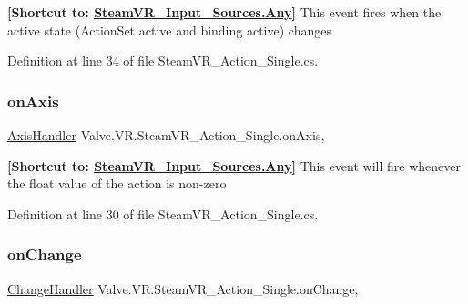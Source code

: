 {\bfseries{\mbox{[}Shortcut to\+: \mbox{\hyperlink{namespace_valve_1_1_v_r_a82e5bf501cc3aa155444ee3f0662853faed36a1ef76a59ee3f15180e0441188ad}{Steam\+V\+R\+\_\+\+Input\+\_\+\+Sources.\+Any}}\mbox{]}}} This event fires when the active state (Action\+Set active and binding active) changes 



Definition at line 34 of file Steam\+V\+R\+\_\+\+Action\+\_\+\+Single.\+cs.

\mbox{\label{class_valve_1_1_v_r_1_1_steam_v_r___action___single_a54b775fb731fcfddfb12298d3c6cd42c}} 
\subsubsection{\texorpdfstring{onAxis}{onAxis}}
{\footnotesize\ttfamily \mbox{\hyperlink{class_valve_1_1_v_r_1_1_steam_v_r___action___single_a4193937cd6b6e4b7248374bc5636f6fd}{Axis\+Handler}} Valve.\+V\+R.\+Steam\+V\+R\+\_\+\+Action\+\_\+\+Single.\+on\+Axis\hspace{0.3cm}{\ttfamily [add]}, {\ttfamily [remove]}}



{\bfseries{\mbox{[}Shortcut to\+: \mbox{\hyperlink{namespace_valve_1_1_v_r_a82e5bf501cc3aa155444ee3f0662853faed36a1ef76a59ee3f15180e0441188ad}{Steam\+V\+R\+\_\+\+Input\+\_\+\+Sources.\+Any}}\mbox{]}}} This event will fire whenever the float value of the action is non-\/zero 



Definition at line 30 of file Steam\+V\+R\+\_\+\+Action\+\_\+\+Single.\+cs.

\mbox{\label{class_valve_1_1_v_r_1_1_steam_v_r___action___single_a86a5b4eead30dce2d9f13859571778d3}} 
\subsubsection{\texorpdfstring{onChange}{onChange}}
{\footnotesize\ttfamily \mbox{\hyperlink{class_valve_1_1_v_r_1_1_steam_v_r___action___single_ae0c72c83dccd88a0235e8a831d62116e}{Change\+Handler}} Valve.\+V\+R.\+Steam\+V\+R\+\_\+\+Action\+\_\+\+Single.\+on\+Change\hspace{0.3cm}{\ttfamily [add]}, {\ttfamily [remove]}}



